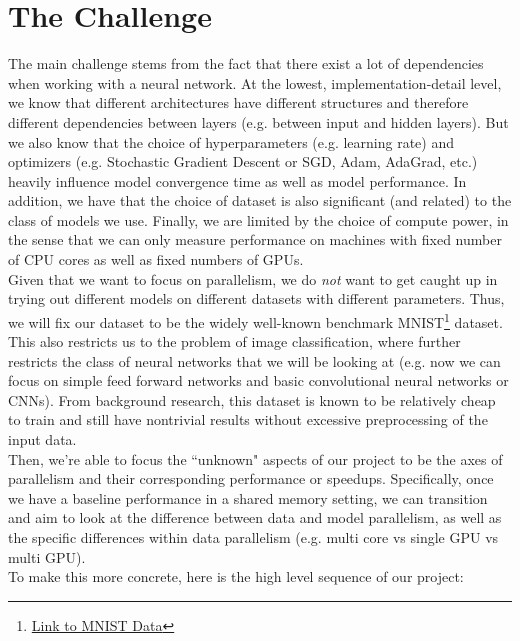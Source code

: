 \documentclass{article}
\begin{document}
\section*{The Challenge}

The main challenge stems from the fact that there exist a lot of dependencies when working with a neural network. At the lowest, implementation-detail level, we know that different architectures have different structures and therefore different dependencies between layers (e.g. between input and hidden layers). But we also know that the choice of hyperparameters (e.g. learning rate) and optimizers (e.g. Stochastic Gradient Descent or SGD, Adam, AdaGrad, etc.) heavily influence model convergence time as well as model performance. In addition, we have that the choice of dataset is also significant (and related) to the class of models we use. Finally, we are limited by the choice of compute power, in the sense that we can only measure performance on machines with fixed number of CPU cores as well as fixed numbers of GPUs.\\

Given that we want to focus on parallelism, we do \textit{not} want to get caught up in trying out different models on different datasets with different parameters. Thus, we will fix our dataset to be the widely well-known benchmark MNIST\footnote{\href{http://yann.lecun.com/exdb/mnist/}{Link to MNIST Data}} dataset. This also restricts us to the problem of image classification, where further restricts the class of neural networks that we will be looking at (e.g. now we can focus on simple feed forward networks and basic convolutional neural networks or CNNs). From background research, this dataset is known to be relatively cheap to train and still have nontrivial results without excessive preprocessing of the input data.\\

Then, we're able to focus the ``unknown" aspects of our project to be the axes of parallelism and their corresponding performance or speedups. Specifically, once we have a baseline performance in a shared memory setting, we can transition and aim to look at the difference between data and model parallelism, as well as the specific differences within data parallelism (e.g. multi core vs single GPU vs multi GPU). \\

To make this more concrete, here is the high level sequence of our project:
\end{document}
